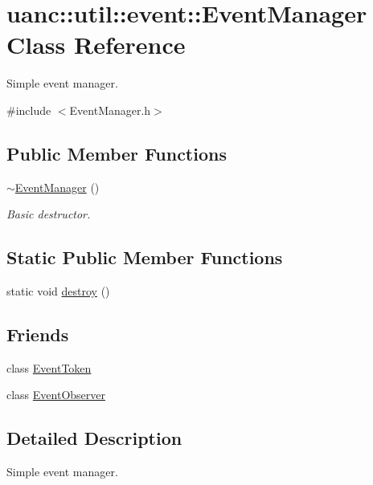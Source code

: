 \hypertarget{classuanc_1_1util_1_1event_1_1_event_manager}{}\section{uanc\+:\+:util\+:\+:event\+:\+:Event\+Manager Class Reference}
\label{classuanc_1_1util_1_1event_1_1_event_manager}


Simple event manager.  




{\ttfamily \#include $<$Event\+Manager.\+h$>$}

\subsection*{Public Member Functions}
\begin{DoxyCompactItemize}
\item 
\hyperlink{classuanc_1_1util_1_1event_1_1_event_manager_a333c19840c05d0785631b1bfc6bf6454}{$\sim$\+Event\+Manager} ()
\begin{DoxyCompactList}\small\item\em Basic destructor. \end{DoxyCompactList}\end{DoxyCompactItemize}
\subsection*{Static Public Member Functions}
\begin{DoxyCompactItemize}
\item 
static void \hyperlink{classuanc_1_1util_1_1event_1_1_event_manager_a344b7c080fb7d569c2b4948cbe8fbb7e}{destroy} ()
\end{DoxyCompactItemize}
\subsection*{Friends}
\begin{DoxyCompactItemize}
\item 
class \hyperlink{classuanc_1_1util_1_1event_1_1_event_manager_ac94178afc9fbbac2a5735d761b6b2ae5}{Event\+Token}
\item 
class \hyperlink{classuanc_1_1util_1_1event_1_1_event_manager_a7512992e19dc2f4613dea5e056e626f9}{Event\+Observer}
\end{DoxyCompactItemize}


\subsection{Detailed Description}
Simple event manager. 

